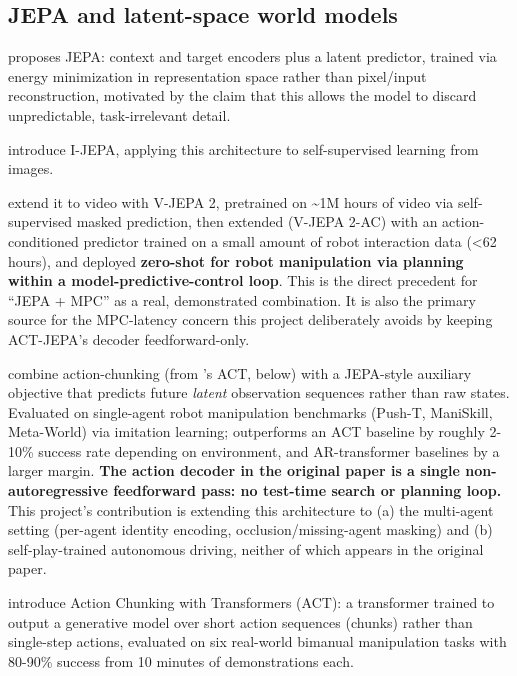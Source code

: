 \documentclass[11pt]{article}
\begin{document}
\hypertarget{jepa-and-latent-space-world-models}{%
\subsection{JEPA and latent-space world models}\label{jepa-and-latent-space-world-models}}

\citet{lecun2022jepa} proposes JEPA: context and target encoders plus a latent predictor, trained via energy minimization in representation space rather than pixel/input reconstruction, motivated by the claim that this allows the model to discard unpredictable, task-irrelevant detail.

\citet{assran2023ijepa} introduce I-JEPA, applying this architecture to self-supervised learning from images.

\citet{assran2025vjepa2} extend it to video with V-JEPA 2, pretrained on \textasciitilde1M hours of video via self-supervised masked prediction, then extended (V-JEPA 2-AC) with an action-conditioned predictor trained on a small amount of robot interaction data (\textless62 hours), and deployed \textbf{zero-shot for robot manipulation via planning within a model-predictive-control loop}. This is the direct precedent for ``JEPA + MPC'' as a real, demonstrated combination. It is also the primary source for the MPC-latency concern this project deliberately avoids by keeping ACT-JEPA's decoder feedforward-only.

\citet{vujinovic2025actjepa} combine action-chunking (from \citet{zhao2023act}'s ACT, below) with a JEPA-style auxiliary objective that predicts future \emph{latent} observation sequences rather than raw states. Evaluated on single-agent robot manipulation benchmarks (Push-T, ManiSkill, Meta-World) via imitation learning; outperforms an ACT baseline by roughly 2-10\% success rate depending on environment, and AR-transformer baselines by a larger margin. \textbf{The action decoder in the original paper is a single non-autoregressive feedforward pass: no test-time search or planning loop.} This project's contribution is extending this architecture to (a) the multi-agent setting (per-agent identity encoding, occlusion/missing-agent masking) and (b) self-play-trained autonomous driving, neither of which appears in the original paper.

\citet{zhao2023act} introduce Action Chunking with Transformers (ACT): a transformer trained to output a generative model over short action sequences (chunks) rather than single-step actions, evaluated on six real-world bimanual manipulation tasks with 80-90\% success from 10 minutes of demonstrations each.
\end{document}
